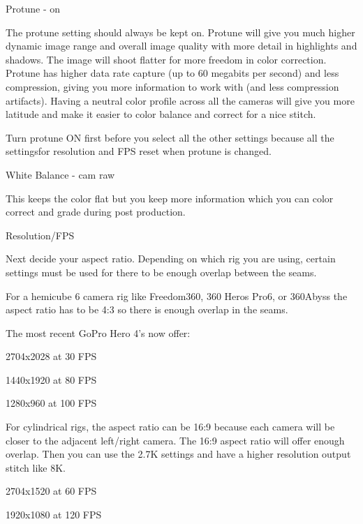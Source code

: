 \begin{fullwidth}
{\large Protune - on \par}


The protune setting should always be kept on. Protune will give you much higher dynamic image range and overall image quality with more detail in highlights and shadows. The image will shoot flatter for more freedom in color correction. Protune has higher data rate capture (up to 60 megabits per second) and less compression, giving you more information to work with (and less compression artifacts). Having a neutral color profile across all the cameras will give you more latitude and make it easier to color balance and correct for a nice stitch. 

\tip Turn protune ON first before you select all the other settings because all the settingsfor resolution and FPS reset when protune is changed.

\clearpage
{\large White Balance - cam raw \par} 


This keeps the color flat but you keep more information which you can color correct and grade during post production.

{\large Resolution/FPS \par}

Next decide your aspect ratio. Depending on which rig you are using, certain settings must be used for there to be enough overlap between the seams. 

For a hemicube 6 camera rig like Freedom360, 360 Heros Pro6, or 360Abyss the aspect ratio has to be 4:3 so there is enough overlap in the seams. 

The most recent GoPro Hero 4's now offer:

2704x2028 at 30 FPS

1440x1920 at 80 FPS

\clearpage
1280x960 at 100 FPS


For cylindrical rigs, the aspect ratio can be 16:9 because each camera will be closer to the adjacent left/right camera. The 16:9 aspect ratio will offer enough overlap. Then you can use the 2.7K settings and have a higher resolution output stitch like 8K. 

2704x1520 at 60 FPS


\clearpage
1920x1080 at 120 FPS


\end{fullwidth}

